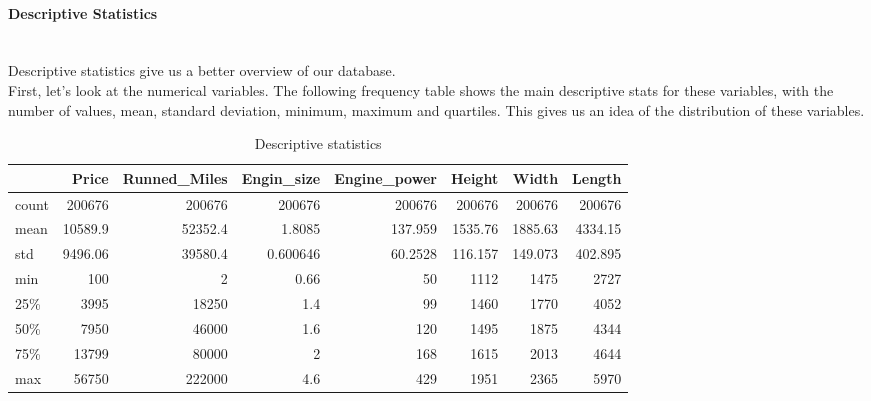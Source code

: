 \documentclass[12pt]{article}
\begin{document}
\paragraph{Descriptive Statistics}
~~\\

\noindent Descriptive statistics give us a better overview of our database.\\

\noindent First, let's look at the numerical variables. The following frequency table shows the main descriptive stats for these variables, with the number of values, mean, standard deviation, minimum, maximum and quartiles. This gives us an idea of the distribution of these variables.\\


\begin{table}[h]
    \centering
    \caption{ Descriptive statistics}
    \begin{tabular}{lrrrrrrr}
    \toprule
           & Price & Runned\_Miles & Engin\_size & Engine\_power & Height & Width & Length \\
    \midrule
     count & 200676 & 200676 & 200676 & 200676 & 200676 & 200676 & 200676 \\
     mean & 10589.9 & 52352.4 & 1.8085 & 137.959 & 1535.76 & 1885.63 & 4334.15 \\
     std & 9496.06 & 39580.4 & 0.600646 & 60.2528 & 116.157 & 149.073 & 402.895 \\
     min & 100 & 2 & 0.66 & 50 & 1112 & 1475 & 2727 \\
     25\% & 3995 & 18250 & 1.4 & 99 & 1460 & 1770 & 4052 \\
     50\% & 7950 & 46000 & 1.6 & 120 & 1495 & 1875 & 4344 \\
     75\% & 13799 & 80000 & 2 & 168 & 1615 & 2013 & 4644 \\
     max & 56750 & 222000 & 4.6 & 429 & 1951 & 2365 & 5970 \\
    \bottomrule
    \end{tabular}
\end{table}
\end{document}
